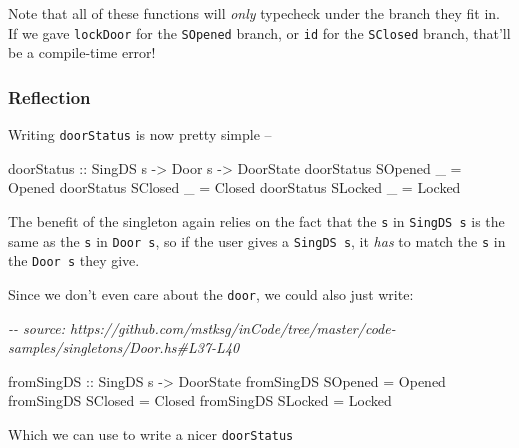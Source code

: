 \documentclass[]{article}
\newenvironment{Shaded}{}{}
\newcommand{\CommentTok}[1]{\textcolor[rgb]{0.38,0.63,0.69}{\textit{#1}}}
\newcommand{\DataTypeTok}[1]{\textcolor[rgb]{0.56,0.13,0.00}{#1}}
\newcommand{\NormalTok}[1]{#1}
\newcommand{\OtherTok}[1]{\textcolor[rgb]{0.00,0.44,0.13}{#1}}
\begin{document}
Note that all of these functions will \emph{only} typecheck under the branch
they fit in. If we gave \texttt{lockDoor} for the \texttt{SOpened} branch, or
\texttt{id} for the \texttt{SClosed} branch, that'll be a compile-time error!

\hypertarget{reflection}{%
\subsubsection{Reflection}\label{reflection}}

Writing \texttt{doorStatus} is now pretty simple --

\begin{Shaded}
\begin{Highlighting}[]
\OtherTok{doorStatus ::} \DataTypeTok{SingDS}\NormalTok{ s }\OtherTok{{-}>} \DataTypeTok{Door}\NormalTok{ s }\OtherTok{{-}>} \DataTypeTok{DoorState}
\NormalTok{doorStatus }\DataTypeTok{SOpened}\NormalTok{ \_ }\OtherTok{=} \DataTypeTok{Opened}
\NormalTok{doorStatus }\DataTypeTok{SClosed}\NormalTok{ \_ }\OtherTok{=} \DataTypeTok{Closed}
\NormalTok{doorStatus }\DataTypeTok{SLocked}\NormalTok{ \_ }\OtherTok{=} \DataTypeTok{Locked}
\end{Highlighting}
\end{Shaded}

The benefit of the singleton again relies on the fact that the \texttt{s} in
\texttt{SingDS\ s} is the same as the \texttt{s} in \texttt{Door\ s}, so if the
user gives a \texttt{SingDS\ s}, it \emph{has} to match the \texttt{s} in the
\texttt{Door\ s} they give.

Since we don't even care about the \texttt{door}, we could also just write:

\begin{Shaded}
\begin{Highlighting}[]
\CommentTok{{-}{-} source: https://github.com/mstksg/inCode/tree/master/code{-}samples/singletons/Door.hs\#L37{-}L40}

\OtherTok{fromSingDS ::} \DataTypeTok{SingDS}\NormalTok{ s }\OtherTok{{-}>} \DataTypeTok{DoorState}
\NormalTok{fromSingDS }\DataTypeTok{SOpened} \OtherTok{=} \DataTypeTok{Opened}
\NormalTok{fromSingDS }\DataTypeTok{SClosed} \OtherTok{=} \DataTypeTok{Closed}
\NormalTok{fromSingDS }\DataTypeTok{SLocked} \OtherTok{=} \DataTypeTok{Locked}
\end{Highlighting}
\end{Shaded}

Which we can use to write a nicer \texttt{doorStatus}
\end{document}
